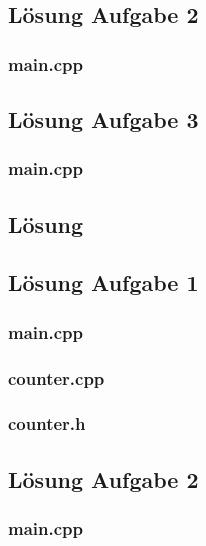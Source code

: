 \subsection{Lösung Aufgabe 2}
\subsubsection{main.cpp}

\subsection{Lösung Aufgabe 3}
\subsubsection{main.cpp}


\setcounter{section}{12}

\subsection{Lösung}
\subsection{Lösung Aufgabe 1}
\subsubsection{main.cpp}

\subsubsection{counter.cpp}

\subsubsection{counter.h}


\subsection{Lösung Aufgabe 2}
\subsubsection{main.cpp}

